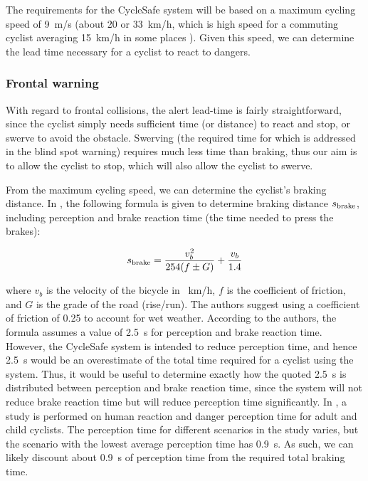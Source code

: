\documentclass[journal]{IEEEtran}
\begin{document}
The requirements for the CycleSafe system will be based on a maximum cycling speed of \SI{9}{\meter/\s} (about \SI{20}{\mph} or \SI{33}{\km/\hour}, which is high speed for a commuting cyclist averaging \SI{15}{\km/\hour} in some places \cite{cycling-speed}). Given this speed, we can determine the lead time necessary for a cyclist to react to dangers.

\subsubsection{Frontal warning}
\label{specs:frontal}
With regard to frontal collisions, the alert lead-time is fairly straightforward, since the cyclist simply needs sufficient time (or distance) to react and stop, or swerve to avoid the obstacle. Swerving (the required time for which is addressed in the blind spot warning) requires much less time than braking, thus our aim is to allow the cyclist to stop, which will also allow the cyclist to swerve.

From the maximum cycling speed, we can determine the cyclist's braking distance. In \cite{braking_distance}, the following formula is given to determine braking distance $s_\text{brake}$, including perception and brake reaction time (the time needed to press the brakes):

\begin{align}
    s_\text{brake} = \frac{v_b^2}{254(f \pm G)} + \frac{v_b}{1.4}
\end{align}

where $v_b$ is the velocity of the bicycle in \SI{}{\km/\hour}, $f$ is the coefficient of friction, and $G$ is the grade of the road (rise/run). The authors suggest using a coefficient of friction of 0.25 to account for wet weather. According to the authors, the formula assumes a value of \SI{2.5}{\s} for perception and brake reaction time. However, the CycleSafe system is intended to reduce perception time, and hence \SI{2.5}{\s} would be an overestimate of the total time required for a cyclist using the system. Thus, it would be useful to determine exactly how the quoted \SI{2.5}{\s} is distributed between perception and brake reaction time, since the system will not reduce brake reaction time but will reduce perception time significantly. In \cite{reaction-time}, a study is performed on human reaction and danger perception time for adult and child cyclists. The perception time for different scenarios in the study varies, but the scenario with the lowest average perception time has \SI{0.9}{\s}. As such, we can likely discount about \SI{0.9}{\s} of perception time from the required total braking time.
\end{document}
